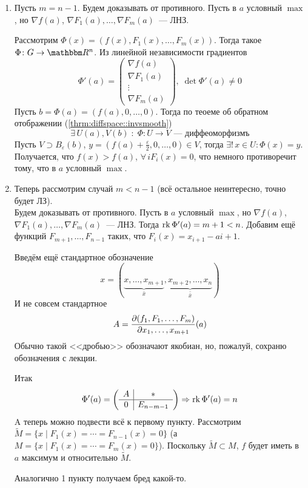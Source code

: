\documentclass[12pt,timbord]{../../../notes}
\begin{document}
\begin{ittproof}
  \begin{enumerate}
    \item Пусть $m = n - 1$. Будем доказывать от противного. Пусть в $a$ условный $\max$, но
      $\nabla f(a)$, $\nabla F_1(a), \dotsc, \nabla F_m(a)$~--- ЛНЗ.

      Рассмотрим $\Phi(x) = (f(x), F_1(x), \dotsc, F_m(x))$. Тогда такое $\Phi\colon G \to \R^n$.
      Из линейной независимости градиентов
      \[
        \Phi'(a) = \begin{pmatrix}
          \nabla f(a) \\ \nabla F_1(a) \\ \vdots \\ \nabla F_m(a) 
        \end{pmatrix}, \; \det \Phi'(a) \neq 0
      \]
      Пусть $b = \Phi(a) = (f(a), 0, \dotsc, 0)$. Тогда по теоеме об обратном отображении 
      (\ref{thrm:diffspace::invsmooth}) 
      \[
        \exists\, U(a), V(b) \;\colon\; \Phi\colon U \to V \text{~--- диффеоморфизмъ}
      \]
      Пусть $V \supset B_\varepsilon(b)$, $y = (f(a)+ \frac{\varepsilon}{2}, 0, \dotsc, 0) \in V$, 
    тогда $\exists!\, x\in U \colon \Phi(x) = y$. Получается, что $f(x) > f(a)$, $\forall\, i
    F_i(x) = 0$, что немного противоречит тому, что в $a$ условный $\max$.
  \item Теперь рассмотрим случай $m < n - 1$ (всё остальное неинтересно, точно будет ЛЗ). \\
    Будем доказывать от противного. Пусть в $a$ условный $\max$, но
    $\nabla f(a)$, $\nabla F_1(a), \dotsc, \nabla F_m(a)$~--- ЛНЗ.
    Тогда $\operatorname{rk} \Phi'(a) = m+1 < n$. Добавим ещё функций $F_{m+1}, \dotsc, F_{n-1}$ таких, что
    $F_i(x) = x_{i+1} - a{i+1}$.

    Введём ещё стандартное обозначение
    \[
      x = (\underbrace{x, \dotsc, x_{m+1}}_{\bar{x}}, \underbrace{x_{m+2}, \dotsc,
      x_n}_{\bar{\bar{x}}})
    \]
    И не совсем стандартное
    \[
      A = \frac{\partial (f_1, F_1, \dotsc, F_m)}{\partial x_1, \dotsc, x_{m+1}}(a)
    \]
    Обычно такой <<дробью>> обозначают якобиан, но, пожалуй, сохраню обозначения с лекции.

    Итак
    \[
      \Phi'(a) = \left(
        \begin{array}{c|c}
          A & * \\
          \hline
          0 & E_{n-m-1}
        \end{array}
      \right) \Rightarrow \operatorname{rk} \Phi'(a) = n
    \]
    A теперь можно подвести всё к первому пункту.
    Рассмотрим $\widetilde{M} = \{x \mid F_1(x) = \cdots = F_{n-1}(x) = 0 \}$ (а 
    $M =  \{x \mid F_1(x) = \cdots = F_{m}(x) = 0 \}$). Поскольку $\widetilde{M} \subset M$,
    $f$ будет иметь в $a$ максимум и относительно $\widetilde{M}$.
    
    Аналогично 1 пункту получаем бред какой-то.
  \end{enumerate}
\end{ittproof}
\end{document}
